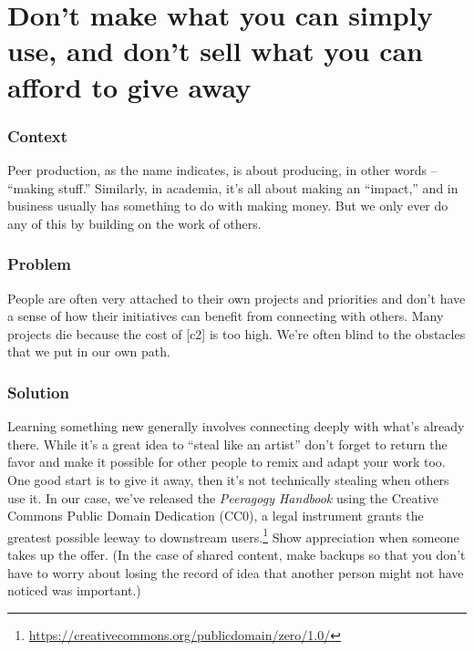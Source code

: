 \begingroup \color{OliveGreen}

\section{Don't make what you can simply use, and don't sell what you can afford to give away} \label{sec:Use_or_make}

\subsubsection*{Context}
Peer production, as the name indicates, is about producing, in other words -- ``making stuff.''  Similarly, in academia, it's all about making an ``impact,'' and in business usually has something to do with making money.  But we only ever do any of this by building on the work of others.    

\subsubsection*{Problem}
People are often very attached to their own projects and priorities and don't have a sense of how their initiatives can benefit from connecting with others. Many projects die because the cost of  [c2] is too high.  We're often blind to the obstacles that we put in our own path.

\subsubsection*{Solution} Learning something new generally involves connecting deeply with what's already there.  While it's a great idea to ``steal like an artist'' don't forget to return the favor and make it possible for other people to remix and adapt your work too.  One good start is to give it away, then it's not technically stealing when others use it.
In our case, we've released the \emph{Peeragogy Handbook} using the Creative Commons Public Domain Dedication (CC0), a legal instrument grants the greatest possible leeway to downstream users.\footnote{\url{https://creativecommons.org/publicdomain/zero/1.0/}}  Show appreciation when someone takes up the offer.  (In the case of shared content, make backups so that you don't have to worry about losing the record of idea that another person might not have noticed was important.)

